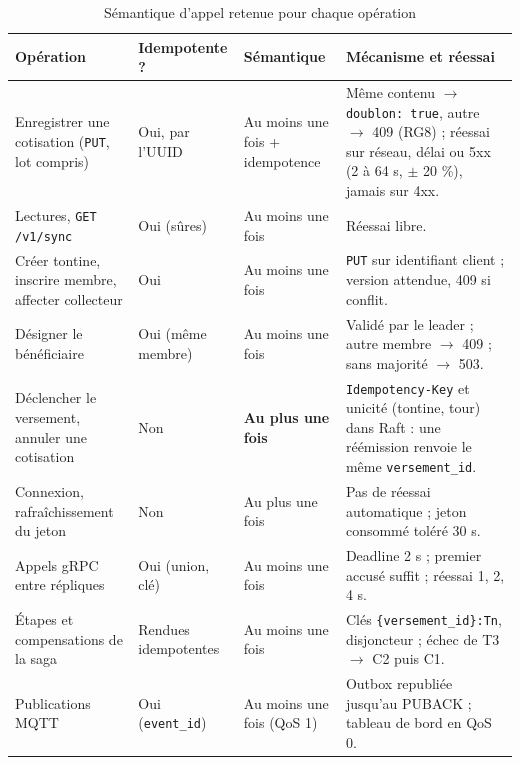 \documentclass[12pt,a4paper]{article}
\begin{document}
\begin{table}[H]
\centering
\small
{}
\begin{tabularx}{\linewidth}{@{}>{\raggedright\arraybackslash}p{4.1cm} >{\raggedright\arraybackslash}p{2.75cm} >{\raggedright\arraybackslash}p{2.3cm} >{\raggedright\arraybackslash}X@{}}
\toprule
\textbf{Opération} & \textbf{Idempotente ?} & \textbf{Sémantique} & \textbf{Mécanisme et réessai} \\
\midrule
Enregistrer une cotisation (\texttt{PUT}, lot compris) & Oui, par l'UUID & Au moins une fois + idempotence &
  Même contenu $\rightarrow$ \texttt{doublon: true}, autre $\rightarrow$ 409 (RG8) ; réessai sur réseau, délai ou 5xx (2 à 64 s, $\pm$ 20 \%), jamais sur 4xx. \\
Lectures, \texttt{GET /v1/sync} & Oui (sûres) & Au moins une fois & Réessai libre. \\
Créer tontine, inscrire membre, affecter collecteur & Oui & Au moins une fois & \texttt{PUT} sur identifiant client ; version attendue, 409 si conflit. \\
Désigner le bénéficiaire & Oui (même membre) & Au moins une fois & Validé par le leader ; autre membre $\rightarrow$ 409 ; sans majorité $\rightarrow$ 503. \\
Déclencher le versement, annuler une cotisation & Non & \textbf{Au plus une fois} &
  \texttt{Idempotency-Key} et unicité (tontine, tour) dans Raft : une réémission renvoie le même \texttt{versement\_id}. \\
Connexion, rafraîchissement du jeton & Non & Au plus une fois & Pas de réessai automatique ; jeton consommé toléré 30 s. \\
Appels gRPC entre répliques & Oui (union, clé) & Au moins une fois & Deadline 2 s ; premier accusé suffit ; réessai 1, 2, 4 s. \\
Étapes et compensations de la saga & Rendues idempotentes & Au moins une fois &
  Clés \texttt{\{versement\_id\}:Tn}, disjoncteur ; échec de T3 $\rightarrow$ C2 puis C1. \\
Publications MQTT & Oui (\texttt{event\_id}) & Au moins une fois (QoS 1) & Outbox republiée jusqu'au PUBACK ; tableau de bord en QoS 0. \\
\bottomrule
\end{tabularx}
\caption{Sémantique d'appel retenue pour chaque opération}
\label{tab:semantique}
\end{table}
\end{document}

